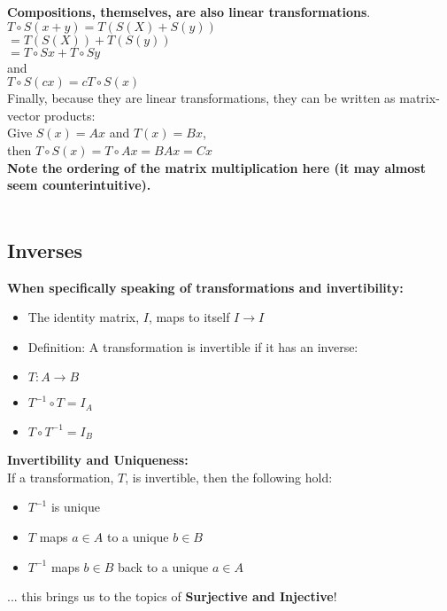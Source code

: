 \textbf{Compositions, themselves, are also linear transformations}.
\\

$T \circ S (x+y) = T(S(X) + S(y))$
\\
$= T(S(X)) + T(S(y))$
\\
$= T \circ Sx + T \circ Sy$
\\
and
\\
$T \circ S (cx) = cT \circ S (x)$
\\

Finally, because they are linear transformations, they can be written as matrix-vector products:
\\

Give $S(x) = Ax$ and $T(x) = Bx$,
\\

then $T \circ S(x) = T \circ Ax = BAx = Cx$
\\

\textbf{Note the ordering of the matrix multiplication here (it may almost seem counterintuitive).}
\\\\

\subsection{Inverses}\label{concept3.7}

\textbf{When specifically speaking of transformations and invertibility:}

\begin{itemize}
	\item The identity matrix, $I$, maps to itself $I \rightarrow I$
	\item Definition: A transformation is invertible if it has an inverse:
		\item $T: A \rightarrow B$
		\item $T^{-1} \circ T = I_A$
		\item $T \circ T^{-1} = I_B$ 
\end{itemize}

\textbf{Invertibility and Uniqueness:}
\\

If a transformation, $T$, is invertible, then the following hold:
\begin{itemize}
	\item $T^{-1}$ is unique
	\item $T$ maps $a \in A$ to a unique $b \in B$
	\item $T^{-1}$ maps $b \in B$ back to a unique $a \in A$
\end{itemize}

... this brings us to the topics of \textbf{Surjective and Injective}!



